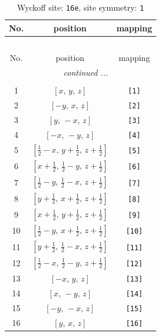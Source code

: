\documentclass[fleqn,8pt]{jsarticle}
\begin{document}
\begin{longtable}{ccc}
\caption{Wyckoff site: {\tt 16e}, site symmetry: {\tt 1}}
 \\
 \hline \hline
No. & position & mapping \\ \hline \endfirsthead

\multicolumn{2}{l}{\tablename\ \thetable{}} \\
 \hline \hline
No. & position & mapping \\ \hline \endhead

 \hline \hline
\multicolumn{2}{r}{\footnotesize\it continued ...} \\ \endfoot

 \hline \hline
\multicolumn{2}{r}{} \\ \endlastfoot

1 & $\left[ x,\, y,\, z \right]$ & {\tt [1]} \\ \hline
2 & $\left[ - y,\, x,\, z \right]$ & {\tt [2]} \\ \hline
3 & $\left[ y,\, - x,\, z \right]$ & {\tt [3]} \\ \hline
4 & $\left[ - x,\, - y,\, z \right]$ & {\tt [4]} \\ \hline
5 & $\left[ \frac{1}{2} - x,\, y + \frac{1}{2},\, z + \frac{1}{2} \right]$ & {\tt [5]} \\ \hline
6 & $\left[ x + \frac{1}{2},\, \frac{1}{2} - y,\, z + \frac{1}{2} \right]$ & {\tt [6]} \\ \hline
7 & $\left[ \frac{1}{2} - y,\, \frac{1}{2} - x,\, z + \frac{1}{2} \right]$ & {\tt [7]} \\ \hline
8 & $\left[ y + \frac{1}{2},\, x + \frac{1}{2},\, z + \frac{1}{2} \right]$ & {\tt [8]} \\ \hline
9 & $\left[ x + \frac{1}{2},\, y + \frac{1}{2},\, z + \frac{1}{2} \right]$ & {\tt [9]} \\ \hline
10 & $\left[ \frac{1}{2} - y,\, x + \frac{1}{2},\, z + \frac{1}{2} \right]$ & {\tt [10]} \\ \hline
11 & $\left[ y + \frac{1}{2},\, \frac{1}{2} - x,\, z + \frac{1}{2} \right]$ & {\tt [11]} \\ \hline
12 & $\left[ \frac{1}{2} - x,\, \frac{1}{2} - y,\, z + \frac{1}{2} \right]$ & {\tt [12]} \\ \hline
13 & $\left[ - x,\, y,\, z \right]$ & {\tt [13]} \\ \hline
14 & $\left[ x,\, - y,\, z \right]$ & {\tt [14]} \\ \hline
15 & $\left[ - y,\, - x,\, z \right]$ & {\tt [15]} \\ \hline
16 & $\left[ y,\, x,\, z \right]$ & {\tt [16]} \\
\end{longtable}
\end{document}
